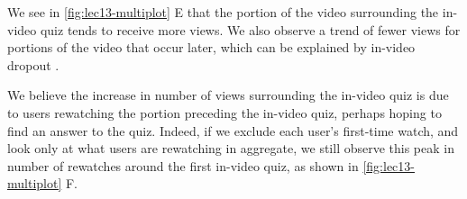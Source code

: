 \documentclass{sigchi}
\begin{document}
We see in \autoref{fig:lec13-multiplot} E that the portion of the video surrounding the in-video quiz tends to receive more views. We also observe a trend of fewer views for portions of the video that occur later, which can be explained by in-video dropout \cite{juho}.


We believe the increase in number of views surrounding the in-video quiz is due to users rewatching the portion preceding the in-video quiz, perhaps hoping to find an answer to the quiz. Indeed, if we exclude each user's first-time watch, and look only at what users are rewatching in aggregate, we still observe this peak in number of rewatches around the first in-video quiz, as shown in \autoref{fig:lec13-multiplot} F. %


\end{document}
